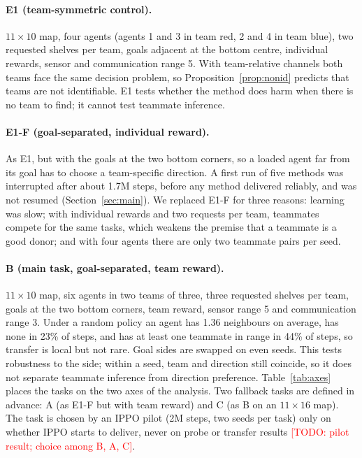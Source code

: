 \documentclass{article}
\theoremstyle{remark}
\newcommand{\todo}[1]{\textcolor{red}{[TODO: #1]}}
\begin{document}
\paragraph{E1 (team-symmetric control).} $11\times10$ map, four agents (agents 1 and 3 in team red, 2 and 4 in team blue),
two requested shelves per team, goals adjacent at the bottom centre, individual rewards, sensor and communication range 5.
With team-relative channels both teams face the same decision problem, so Proposition~\ref{prop:nonid} predicts that
teams are not identifiable. E1 tests whether the method does harm when there is no team to find; it cannot test teammate
inference.

\paragraph{E1-F (goal-separated, individual reward).} As E1, but with the goals at the two bottom corners, so a loaded agent
far from its goal has to choose a team-specific direction. A first run of five methods was interrupted after about 1.7M
steps, before any method delivered reliably, and was not resumed (Section~\ref{sec:main}). We replaced E1-F for three reasons:
learning was slow; with individual rewards and two requests per team, teammates compete for the same tasks, which weakens the
premise that a teammate is a good donor; and with four agents there are only two teammate pairs per seed.

\paragraph{B (main task, goal-separated, team reward).} $11\times10$ map, six agents in two teams of three, three requested
shelves per team, goals at the two bottom corners, team reward, sensor range 5 and communication range 3. Under a random
policy an agent has 1.36 neighbours on average, has none in 23\% of steps, and has at least one teammate in range in 44\% of
steps, so transfer is local but not rare. Goal sides are swapped on even seeds. This tests robustness to the side; within a
seed, team and direction still coincide, so it does not separate teammate inference from direction preference.
Table~\ref{tab:axes} places the tasks on the two axes of the analysis. Two fallback
tasks are defined in advance: A (as E1-F but with team reward) and C (as B on an $11\times16$ map). The task is chosen by an
IPPO pilot (2M steps, two seeds per task) only on whether IPPO starts to deliver, never on probe or transfer results
\todo{pilot result; choice among B, A, C}.
\end{document}

